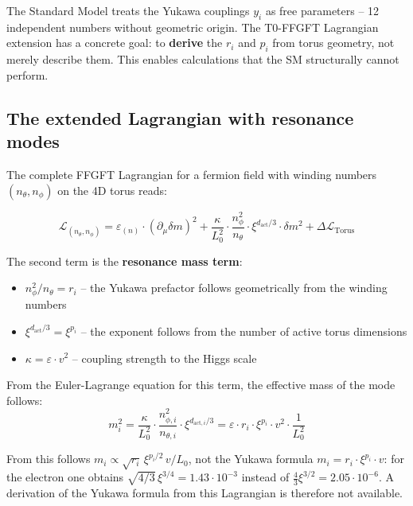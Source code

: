 The Standard Model treats the Yukawa couplings $y_i$ as free
parameters -- 12 independent numbers without geometric origin.
The T0-FFGFT Lagrangian extension has a concrete goal:
to \textbf{derive} the $r_i$ and $p_i$ from torus geometry,
not merely describe them. This enables calculations that the
SM structurally cannot perform.

\subsection{The extended Lagrangian with resonance modes}

The complete FFGFT Lagrangian for a fermion field with winding
numbers $(n_\theta, n_\phi)$ on the 4D torus reads:

\begin{equation}
    \mathcal{L}_{(n_\theta, n_\phi)} = \varepsilon_{(n)} \cdot
    (\partial_\mu \delta m)^2
    + \frac{\kappa}{L_0^2} \cdot \frac{n_\phi^2}{n_\theta} \cdot
    \xi^{d_{\text{act}}/3} \cdot \delta m^2
    + \Delta\mathcal{L}_{\text{Torus}}
    \label{eq:L_extended_en}
\end{equation}

The second term is the \textbf{resonance mass term}:
\begin{itemize}
    \item $n_\phi^2/n_\theta = r_i$ -- the Yukawa prefactor follows
          geometrically from the winding numbers
    \item $\xi^{d_{\text{act}}/3} = \xi^{p_i}$ -- the exponent
          follows from the number of active torus dimensions
    \item $\kappa = \varepsilon \cdot v^2$ -- coupling strength
          to the Higgs scale
\end{itemize}

From the Euler-Lagrange equation for this term, the effective
mass of the mode follows:
\begin{equation}
    m_i^2 = \frac{\kappa}{L_0^2} \cdot \frac{n_{\phi,i}^2}{n_{\theta,i}}
    \cdot \xi^{d_{\text{act},i}/3}
    = \varepsilon \cdot r_i \cdot \xi^{p_i} \cdot v^2 \cdot \frac{1}{L_0^2}
\end{equation}

From this follows $m_i \propto \sqrt{r_i}\,\xi^{p_i/2}\,v/L_0$, not the
Yukawa formula $m_i = r_i \cdot \xi^{p_i} \cdot v$: for the electron one
obtains $\sqrt{4/3}\,\xi^{3/4} = 1.43 \cdot 10^{-3}$ instead of
$\tfrac{4}{3}\xi^{3/2} = 2.05 \cdot 10^{-6}$. A derivation of the Yukawa
formula from this Lagrangian is therefore not available.

